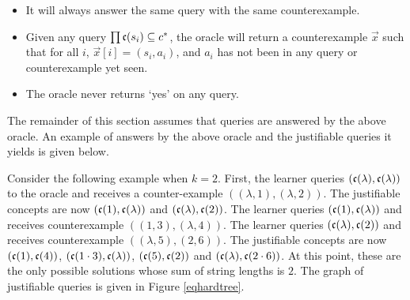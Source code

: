 \begin{itemize}
\item It will always answer the same query with the same counterexample.  
\item Given any query $\prod \mathfrak{c}(s_i) \subseteq c^*$, the oracle will return a counterexample $\vec{x}$ such that for all $i$, $\vec{x}[i] = (s_i, a_i)$, and $a_i$ has not been in any query or counterexample yet seen.
\item The oracle never returns `yes' on any query. 
\end{itemize}

The remainder of this section assumes that queries are answered by the above oracle.
An example of answers by the above oracle and the justifiable queries it yields is given below.

\begin{example}
\label{eqhardex}
Consider the following example when $k = 2$. 
First, the learner queries $(\mathfrak{c}(\lambda), \mathfrak{c}(\lambda))$ to the oracle and receives a counter-example $((\lambda, 1), (\lambda, 2))$. 
The justifiable concepts are now $(\mathfrak{c}(1), \mathfrak{c}(\lambda))$ and $(\mathfrak{c}(\lambda), \mathfrak{c}(2))$. 
The learner queries $(\mathfrak{c}(1), \mathfrak{c}(\lambda))$ and receives counterexample  $((1, 3), (\lambda, 4))$. 
 The learner queries $(\mathfrak{c}(\lambda), \mathfrak{c}(2))$ and receives counterexample $((\lambda, 5), (2, 6))$.
The justifiable concepts are now  $(\mathfrak{c}(1), \mathfrak{c}(4))$, $(\mathfrak{c}(1 \cdot 3), \mathfrak{c}(\lambda))$, $(\mathfrak{c}(5), \mathfrak{c}(2))$ and $(\mathfrak{c}(\lambda), \mathfrak{c}(2 \cdot 6))$.  
At this point, these are the only possible solutions whose sum of string lengths is $2$.
The graph of justifiable queries is given in Figure \ref{eqhardtree}.
\end{example}



